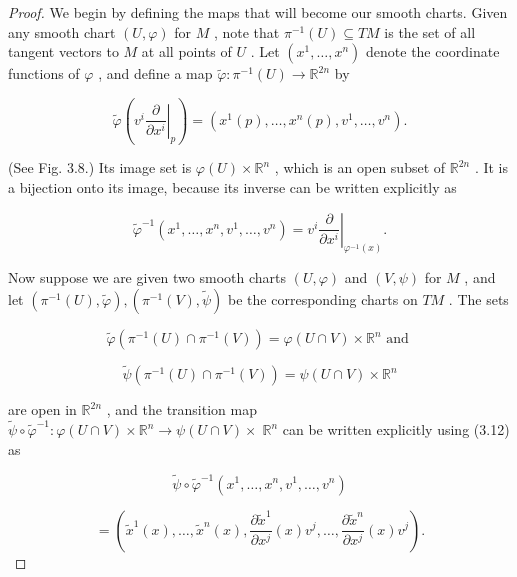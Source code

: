 \begin{proof}
We begin by defining the maps that will become our smooth charts. Given any smooth chart $\left( {U,\varphi }\right)$ for $M$ , note that ${\pi }^{-1}\left( U\right)  \subseteq  {TM}$ is the set of all tangent vectors to $M$ at all points of $U$ . Let $\left( {{x}^{1},\ldots ,{x}^{n}}\right)$ denote the coordinate functions of $\varphi$ , and define a map $\widetilde{\varphi } : {\pi }^{-1}\left( U\right)  \rightarrow  {\mathbb{R}}^{2n}$ by

\[
\widetilde{\varphi }\left( {\left. {v}^{i}\frac{\partial }{\partial {x}^{i}}\right| }_{p}\right)  = \left( {{x}^{1}\left( p\right) ,\ldots ,{x}^{n}\left( p\right) ,{v}^{1},\ldots ,{v}^{n}}\right) . \tag{3.13}
\]

(See Fig. 3.8.) Its image set is $\varphi \left( U\right)  \times  {\mathbb{R}}^{n}$ , which is an open subset of ${\mathbb{R}}^{2n}$ . It is a bijection onto its image, because its inverse can be written explicitly as

\[
{\widetilde{\varphi }}^{-1}\left( {{x}^{1},\ldots ,{x}^{n},{v}^{1},\ldots ,{v}^{n}}\right)  = {\left. {v}^{i}\frac{\partial }{\partial {x}^{i}}\right| }_{{\varphi }^{-1}\left( x\right) }.
\]

Now suppose we are given two smooth charts $\left( {U,\varphi }\right)$ and $\left( {V,\psi }\right)$ for $M$ , and let $\left( {{\pi }^{-1}\left( U\right) ,\widetilde{\varphi }}\right) ,\left( {{\pi }^{-1}\left( V\right) ,\widetilde{\psi }}\right)$ be the corresponding charts on ${TM}$ . The sets

\[
\widetilde{\varphi }\left( {{\pi }^{-1}\left( U\right)  \cap  {\pi }^{-1}\left( V\right) }\right)  = \varphi \left( {U \cap  V}\right)  \times  {\mathbb{R}}^{n}\text{ and }
\]

\[
\widetilde{\psi }\left( {{\pi }^{-1}\left( U\right)  \cap  {\pi }^{-1}\left( V\right) }\right)  = \psi \left( {U \cap  V}\right)  \times  {\mathbb{R}}^{n}
\]

are open in ${\mathbb{R}}^{2n}$ , and the transition map $\widetilde{\psi } \circ  {\widetilde{\varphi }}^{-1} : \varphi \left( {U \cap  V}\right)  \times  {\mathbb{R}}^{n} \rightarrow  \psi \left( {U \cap  V}\right)  \times \; {\mathbb{R}}^{n}$ can be written explicitly using (3.12) as

\[
\widetilde{\psi } \circ  {\widetilde{\varphi }}^{-1}\left( {{x}^{1},\ldots ,{x}^{n},{v}^{1},\ldots ,{v}^{n}}\right)
\]

\[
= \left( {{\widetilde{x}}^{1}\left( x\right) ,\ldots ,{\widetilde{x}}^{n}\left( x\right) ,\frac{\partial {\widetilde{x}}^{1}}{\partial {x}^{j}}\left( x\right) {v}^{j},\ldots ,\frac{\partial {\widetilde{x}}^{n}}{\partial {x}^{j}}\left( x\right) {v}^{j}}\right) .
\]


\end{proof}
